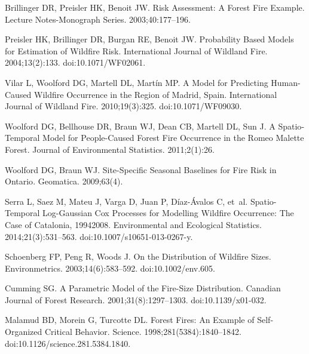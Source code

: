 \documentclass[10pt,letterpaper]{article}
\begin{document}
\begin{thebibliography}{10}
Brillinger DR, Preisler HK, Benoit JW.
\newblock Risk {{Assessment}}: {{A Forest Fire Example}}.
\newblock Lecture Notes-Monograph Series. 2003;40:177--196.

Preisler HK, Brillinger DR, Burgan RE, Benoit JW.
\newblock Probability Based Models for Estimation of Wildfire Risk.
\newblock International Journal of Wildland Fire. 2004;13(2):133.
\newblock doi:{10.1071/WF02061}.

Vilar L, Woolford DG, Martell DL, Mart{\'i}n MP.
\newblock A Model for Predicting Human-Caused Wildfire Occurrence in the Region
  of {{Madrid}}, {{Spain}}.
\newblock International Journal of Wildland Fire. 2010;19(3):325.
\newblock doi:{10.1071/WF09030}.

Woolford DG, Bellhouse DR, Braun WJ, Dean CB, Martell DL, Sun J.
\newblock A {{Spatio}}-Temporal {{Model}} for {{People}}-{{Caused Forest Fire
  Occurrence}} in the {{Romeo Malette Forest}}.
\newblock Journal of Environmental Statistics. 2011;2(1):26.

Woolford DG, Braun WJ.
\newblock Site-Specific Seasonal Baselines for Fire Risk in {{Ontario}}.
\newblock Geomatica. 2009;63(4).

Serra L, Saez M, Mateu J, Varga D, Juan P, {D{\'i}az-{\'A}valos} C, et~al.
\newblock Spatio-Temporal Log-{{Gaussian Cox}} Processes for Modelling Wildfire
  Occurrence: The Case of {{Catalonia}}, 1994\textendash{}2008.
\newblock Environmental and Ecological Statistics. 2014;21(3):531--563.
\newblock doi:{10.1007/s10651-013-0267-y}.

Schoenberg FP, Peng R, Woods J.
\newblock On the Distribution of Wildfire Sizes.
\newblock Environmetrics. 2003;14(6):583--592.
\newblock doi:{10.1002/env.605}.

Cumming SG.
\newblock A Parametric Model of the Fire-Size Distribution.
\newblock Canadian Journal of Forest Research. 2001;31(8):1297--1303.
\newblock doi:{10.1139/x01-032}.

Malamud BD, Morein G, Turcotte DL.
\newblock Forest {{Fires}}: {{An Example}} of {{Self}}-{{Organized Critical
  Behavior}}.
\newblock Science. 1998;281(5384):1840--1842.
\newblock doi:{10.1126/science.281.5384.1840}.


\end{thebibliography}
\end{document}
